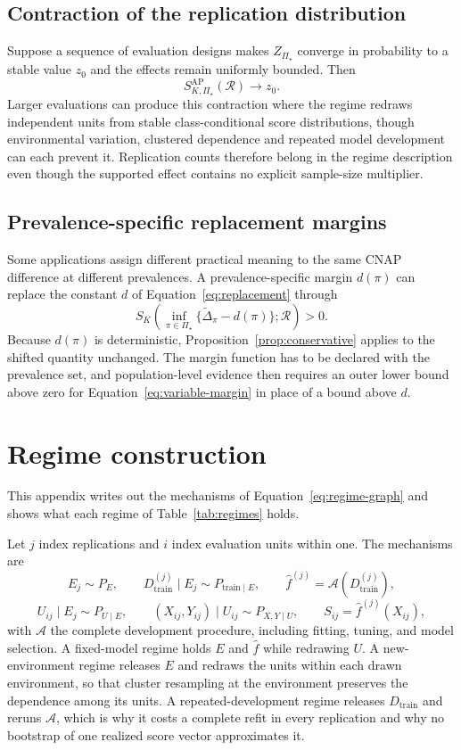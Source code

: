 \documentclass[11pt]{article}
\newcommand{\Regime}{\mathcal{R}}
\newcommand{\PSet}{\Pi_\star}
\newcommand{\Dta}{\widetilde{\Delta}}
\theoremstyle{remark}
\begin{document}
\subsection{Contraction of the replication distribution}

Suppose a sequence of evaluation designs makes $Z_{\PSet}$ converge in probability to a stable value $z_0$ and the effects remain uniformly bounded. Then
\[
S_{K,\PSet}^{\mathrm{AP}}(\Regime)
\longrightarrow
z_0.
\]
Larger evaluations can produce this contraction where the regime redraws independent units from stable class-conditional score distributions, though environmental variation, clustered dependence and repeated model development can each prevent it. Replication counts therefore belong in the regime description even though the supported effect contains no explicit sample-size multiplier.

\subsection{Prevalence-specific replacement margins}
\label{app:variable-margin}

Some applications assign different practical meaning to the same CNAP difference at different prevalences. A prevalence-specific margin $d(\pi)$ can replace the constant $d$ of Equation~\eqref{eq:replacement} through
\begin{equation}
S_K\left(
\inf_{\pi\in\PSet}
\{\Dta_\pi-d(\pi)\};
\Regime
\right)>0.
\label{eq:variable-margin}
\end{equation}
Because $d(\pi)$ is deterministic, Proposition~\ref{prop:conservative} applies to the shifted quantity unchanged. The margin function has to be declared with the prevalence set, and population-level evidence then requires an outer lower bound above zero for Equation~\eqref{eq:variable-margin} in place of a bound above $d$.


\section{Regime construction}
\label{app:regime}

This appendix writes out the mechanisms of Equation~\eqref{eq:regime-graph} and shows what each regime of Table~\ref{tab:regimes} holds.

Let $j$ index replications and $i$ index evaluation units within one. The mechanisms are
\[
E_j\sim P_E,
\qquad
D_{\mathrm{train}}^{(j)}\mid E_j\sim P_{\mathrm{train}\mid E},
\qquad
\widehat f^{(j)}=\mathcal{A}\!\left(D_{\mathrm{train}}^{(j)}\right),
\]
\[
U_{ij}\mid E_j\sim P_{U\mid E},
\qquad
(X_{ij},Y_{ij})\mid U_{ij}\sim P_{X,Y\mid U},
\qquad
S_{ij}=\widehat f^{(j)}(X_{ij}),
\]
with $\mathcal{A}$ the complete development procedure, including fitting, tuning, and model selection. A fixed-model regime holds $E$ and $\widehat f$ while redrawing $U$. A new-environment regime releases $E$ and redraws the units within each drawn environment, so that cluster resampling at the environment preserves the dependence among its units. A repeated-development regime releases $D_{\mathrm{train}}$ and reruns $\mathcal{A}$, which is why it costs a complete refit in every replication and why no bootstrap of one realized score vector approximates it.
\end{document}
